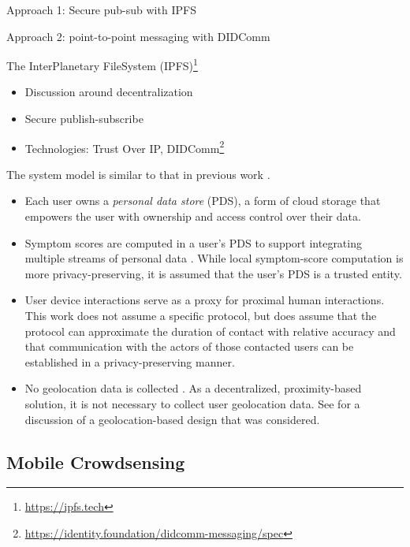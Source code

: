 Approach 1: Secure pub-sub with IPFS

Approach 2: point-to-point messaging with DIDComm

The InterPlanetary FileSystem (IPFS)\footnote{\url{https://ipfs.tech}} \citep{Benet2014, Trautwein2022}

\begin{itemize}
  \item Discussion around decentralization \citep{Troncoso2017}
  \item Secure publish-subscribe
  \item Technologies: Trust Over IP, DIDComm\footnote{\url{https://identity.foundation/didcomm-messaging/spec}}
\end{itemize}

The system model is similar to that in previous work \citep{Ayday2020, Ayday2021}.
\begin{itemize}
  \item Each user owns a \emph{personal data store} (PDS), a form of cloud storage that empowers the user with ownership and access control over their data.
  \item Symptom scores are computed in a user's PDS to support integrating multiple streams of personal data \citep{Ayday2020}. While local symptom-score computation \citep{Ayday2020, Ayday2021} is more privacy-preserving, it is assumed that the user's PDS is a trusted entity.
  \item User device interactions serve as a proxy for proximal human interactions. This work does not assume a specific protocol, but does assume that the protocol can approximate the duration of contact with relative accuracy and that communication with the actors of those contacted users can be established in a privacy-preserving manner.
  \item No geolocation data is collected \citep{Ayday2020}. As a decentralized, proximity-based solution, it is not necessary to collect user geolocation data. See  for a discussion of a geolocation-based design that was considered.
\end{itemize}

\subsection{Mobile Crowdsensing}

